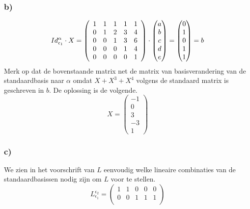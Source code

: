 \documentclass[lineaire_algebra_oplossingen.tex]{subfiles}
\begin{document}
\subsubsection*{b)}
\[
Id_{\epsilon_1}^\alpha\cdot X  =
\left(
\begin{array}{c c c c c}
1 & 1 & 1 & 1 & 1\\ 
0 & 1 & 2 & 3 & 4\\ 
0 & 0 & 1 & 3 & 6\\ 
0 & 0 & 0 & 1 & 4\\ 
0 & 0 & 0 & 0 & 1\\ 
\end{array}
\right)
\cdot 
\begin{pmatrix}
a\\b\\c\\d\\e
\end{pmatrix}
=
\begin{pmatrix}
0\\1\\0\\1\\1
\end{pmatrix}
=
b
\]
Merk op dat de bovenstaande matrix net de matrix van basisverandering van de standaardbasis naar $\alpha$ omdat $X+X^3+X^4$ volgens de standaard matrix is geschreven in $b$.
De oplossing is de volgende.
\[
X = 
\begin{pmatrix}
-1 \\ 0 \\ 3 \\ -3 \\ 1
\end{pmatrix}
\]

\subsubsection*{c)}
We zien in het voorschrift van $L$ eenvoudig welke lineaire combinaties van de standaardbasissen nodig zijn om $L$ voor te stellen.
\[
L_{\epsilon_{1}}^{\epsilon_2}=
\begin{pmatrix}
1 & 1 & 0 & 0 & 0\\
0 & 0 & 1 & 1 & 1\\
\end{pmatrix}
\]
\end{document}
